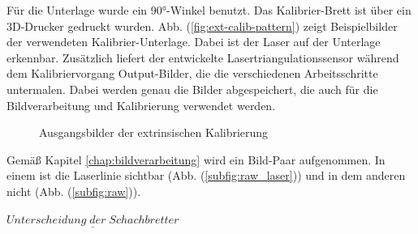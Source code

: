		Für die Unterlage wurde ein 90°-Winkel benutzt. Das Kalibrier-Brett ist über ein 3D-Drucker gedruckt wurden. Abb. (\ref{fig:ext-calib-pattern}) zeigt Beispielbilder der verwendeten Kalibrier-Unterlage. Dabei ist der Laser auf der Unterlage erkennbar. \newline
		Zusätzlich liefert der entwickelte Lasertriangulationssensor während dem Kalibriervorgang Output-Bilder, die die verschiedenen Arbeitsschritte untermalen. Dabei werden genau die Bilder abgespeichert, die auch für die Bildverarbeitung und Kalibrierung verwendet werden.
		
		\begin{figure}[h]
			\centering
			\caption{Ausgangsbilder der extrinsischen Kalibrierung}
			\label{fig:ext-calib-raw}
		\end{figure} 
	
		Gemäß Kapitel \ref{chap:bildverarbeitung} wird ein Bild-Paar aufgenommen. In einem ist die Laserlinie sichtbar (Abb. (\ref{subfig:raw_laser})) und in dem anderen nicht (Abb. (\ref{subfig:raw})).
		
		\newpage
		
		$\underline{Unterscheidung \; der \; Schachbretter}$
		
